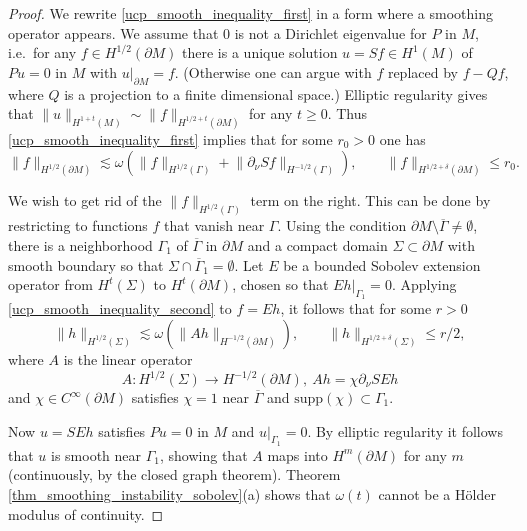 \documentclass[12pt,twoside]{amsart}
\numberwithin{equation}{section}
\renewcommand{\leq}{\leqslant}
\renewcommand{\geq}{\geqslant}
\newcommand {\p} {\partial}
\newcommand{\norm}[1]{\lVert #1 \rVert}         %
\newcommand{\ol}[1]{\overline{#1}}
\newcommand{\supp}{\mathrm{supp}}
\begin{document}
\begin{proof}
We rewrite \eqref{ucp_smooth_inequality_first} in a form where a smoothing operator appears. We assume that $0$ is not a Dirichlet eigenvalue for $P$ in $M$, i.e.\ for any $f \in H^{1/2}(\p M)$ there is a unique solution $u = Sf \in H^1(M)$ of $Pu = 0$ in $M$ with $u|_{\p M} = f$. (Otherwise one can argue with $f$ replaced by $f-Qf$, where $Q$ is a projection to a finite dimensional space.) Elliptic regularity gives that $\norm{u}_{H^{1+t}(M)} \sim \norm{f}_{H^{1/2+t}(\p M)}$ for any $t \geq 0$. Thus \eqref{ucp_smooth_inequality_first} implies that for some $r_0 > 0$ one has 
\begin{equation} \label{ucp_smooth_inequality_second}
\norm{f}_{H^{1/2}(\p M)} \lesssim \omega(\norm{f}_{H^{1/2}(\Gamma)} + \norm{\p_{\nu} Sf}_{H^{-1/2}(\Gamma)}), \qquad \norm{f}_{H^{1/2+\delta}(\p M)} \leq r_0.
\end{equation}

We wish to get rid of the $\norm{f}_{H^{1/2}(\Gamma)}$ term on the right. This can be done by restricting to functions $f$ that vanish near $\Gamma$. Using the condition $\p M \setminus \ol{\Gamma} \neq \emptyset$, there is a neighborhood $\Gamma_1$ of $\ol{\Gamma}$ in $\p M$ and a compact domain $\Sigma \subset \p M$ with smooth boundary so that $\Sigma \cap \ol{\Gamma}_1 = \emptyset$. Let $E$ be a bounded Sobolev extension operator from $H^t(\Sigma)$ to $H^t(\p M)$, chosen so that $Eh|_{\Gamma_1} = 0$. Applying \eqref{ucp_smooth_inequality_second} to $f = Eh$, it follows that for some $r > 0$ 
\[
\norm{h}_{H^{1/2}(\Sigma)} \lesssim \omega(\norm{Ah}_{H^{-1/2}(\p M)}), \qquad \norm{h}_{H^{1/2+\delta}(\Sigma)} \leq r/2,
\]
where $A$ is the linear operator 
\[
A: H^{1/2}(\Sigma) \to H^{-1/2}(\p M), \ Ah = \chi \p_{\nu} S E h
\]
and $\chi \in C^{\infty}(\p M)$ satisfies $\chi=1$ near $\ol{\Gamma}$ and $\supp(\chi) \subset \Gamma_1$.



Now $u = SEh$ satisfies $Pu = 0$ in $M$ and $u|_{\Gamma_1} = 0$. By elliptic regularity it follows that $u$ is smooth near $\Gamma_1$, showing that $A$ maps into $H^m(\p M)$ for any $m$ (continuously, by the closed graph theorem). Theorem \ref{thm_smoothing_instability_sobolev}(a) shows that $\omega(t)$ cannot be a H\"older modulus of continuity.


\end{proof}
\end{document}
